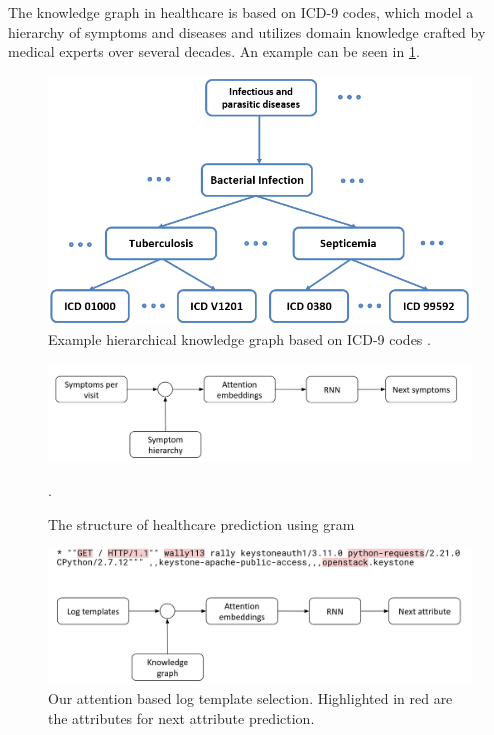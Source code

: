 The knowledge graph in healthcare is based on ICD-9 codes, which model a hierarchy of symptoms and diseases and utilizes domain knowledge crafted by medical experts over several decades. An example can be seen in \ref{fig:icd9}.
\begin{figure}[H]
    \centering
    \includegraphics[keepaspectratio=true,scale=0.3]{figures/4_methods/ICD-9-hierarchy-of-diseases.png}
    \caption{Example hierarchical knowledge graph based on ICD-9 codes \cite{icd9}.}
    \label{fig:icd9}
\end{figure}

\begin{figure}[H]
    \centering
    \includegraphics[keepaspectratio=true,scale=0.3]{figures/4_methods/8_healthcare.png}
    \caption{The structure of healthcare prediction using gram \cite{choi2017gram}}.
    \label{fig:healthcare}
\end{figure}

\begin{figure}[H]
    \centering
    \includegraphics[keepaspectratio=true,scale=0.3]{figures/4_methods/9_monitoring.png}
    \caption{Our attention based log template selection. Highlighted in red are the attributes for next attribute prediction.}
    \label{fig:monitoring}
\end{figure}

